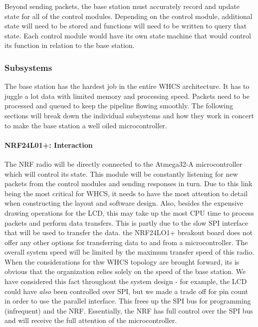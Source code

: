
Beyond sending packets, the base station must accurately record and update
state for all of the control modules. Depending on the control module,
additional state will need to be stored and functions will need to be written
to query that state. Each control module would have its own state machine that
would control its function in relation to the base station.

%

\subsubsection{Subsystems}
The base station has the hardest job in the entire WHCS architecture. It has to
juggle a lot data with limited memory and processing speed. Packets need to be
processed and queued to keep the pipeline flowing smoothly. The following
sections will break down the individual subsystems and how they work in concert
to make the base station a well oiled microcontroller.

\paragraph{NRF24L01+: Interaction}
The NRF radio will be directly connected to the Atmega32-A microcontroller
which will control its state. This module will be constantly listening for new
packets from the control modules and sending responses in turn. Due to this
link being the most critical for WHCS, it needs to have the most attention to
detail when constructing the layout and software design. Also, besides the
expensive drawing operations for the LCD, this may take up the most CPU time to
process packets and perform data transfers. This is partly due to the slow SPI
interface that will be used to transfer the data. the NRF24LO1+ breakout board
does not offer any other options for transferring data to and from a
microcontroller. The overall system speed will be limited by the maximum
transfer speed of this radio. When the considerations for thw WHCS topology are
brought forward, its is obvious that the organization relies solely on the
speed of the base station. We have considered this fact throughout the system
design - for example, the LCD could have \emph{also} been controlled over SPI,
but we made a trade off for pin count in order to use the parallel interface.
This frees up the SPI bus for programming (infrequent) and the NRF.
Essentially, the NRF has full control over the SPI bus and will receive the
full attention of the microcontroller. 

